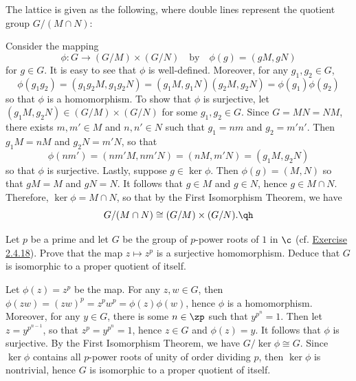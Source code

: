 \begin{sol}
    The lattice is given as the following, where double lines represent the quotient group $G/(M \cap N)$:
    \begin{center}
    \end{center}
    Consider the mapping
    \[\phi : G \to (G/M) \times (G/N) \quad \text{by} \quad \phi(g) = (gM, gN)\]
    for $g \in G$. It is easy to see that $\phi$ is well-defined. Moreover, for any $g_1, g_2 \in G$,
    \[\phi(g_1g_2) = (g_1g_2M, g_1g_2N) = (g_1M, g_1N)(g_2M, g_2N) = \phi(g_1)\phi(g_2)\]
    so that $\phi$ is a homomorphism. To show that $\phi$ is surjective, let $(g_1M, g_2N) \in (G/M) \times (G/N)$ for some $g_1, g_2 \in G$. Since $G = MN = NM$, there exists $m, m' \in M$ and $n, n' \in N$ such that $g_1 = nm$ and $g_2 = m'n'$. Then $g_1M = nM$ and $g_2N = m'N$, so that
    \[\phi(nm') = (nm'M, nm'N) = (nM, m'N) = (g_1M, g_2N)\]
    so that $\phi$ is surjective. Lastly, suppose $g \in \ker\phi$. Then $\phi(g) = (M, N)$ so that $gM = M$ and $gN = N$. It follows that $g \in M$ and $g \in N$, hence $g \in M \cap N$. Therefore, $\ker\phi = M \cap N$, so that by the First Isomorphism Theorem, we have
    \[G/(M \cap N) \cong (G/M) \times (G/N). \qh\]
\end{sol}

\begin{exercise}\label{ex3.3.8}
    Let $p$ be a prime and let $G$ be the group of $p$-power roots  of $1$ in $\c$ (cf. \hyperref[ex2.4.18]{Exercise 2.4.18}). Prove that the map $z \mapsto z^p$ is a surjective homomorphism. Deduce that $G$ is isomorphic to a proper quotient of itself.
\end{exercise}

\begin{sol}
    Let $\phi(z) = z^p$ be the map. For any $z, w \in G$, then $\phi(zw) = (zw)^p = z^p w^p = \phi(z)\phi(w)$, hence $\phi$ is a homomorphism. Moreover, for any $y \in G$, there is some $n \in \zp$ such that $y^{p^n} = 1$. Then let $z = y^{p^{n - 1}}$, so that $z^p = y^{p^n} = 1$, hence $z \in G$ and $\phi(z) = y$. It follows that $\phi$ is surjective. By the First Isomorphism Theorem, we have $G/\ker\phi \cong G$. Since $\ker\phi$ contains all $p$-power roots of unity of order dividing $p$, then $\ker\phi$ is nontrivial, hence $G$ is isomorphic to a proper quotient of itself.
\end{sol}

